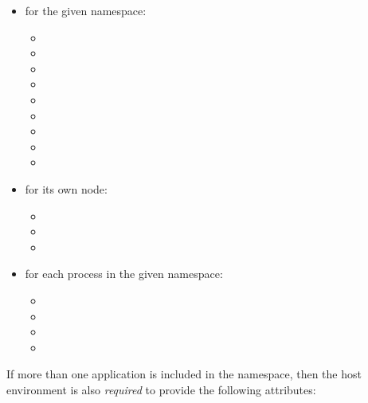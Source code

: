 \begin{itemize}
    \item for the given namespace:
        \begin{itemize}
            \item {}
            \item {}
            \item {}
            \item {}
            \item {}
            \item {}
            \item {}
            \item {}
            \item {}
        \end{itemize}
    \item for its own node:
        \begin{itemize}
            \item {}
            \item {}
            \item {}
        \end{itemize}
    \item for each process in the given namespace:
        \begin{itemize}
            \item {}
            \item {}
            \item {}
            \item {}
        \end{itemize}
\end{itemize}

If more than one application is included in the namespace, then the host environment is also \textit{required} to provide the following attributes:

